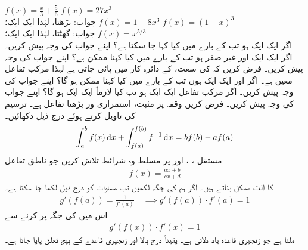 $f(x)=\tfrac{x}{3}+\tfrac{5}{6}$
$f(x)=27x^3$\\
جواب:\quad
بڑھتا، لہٰذا ایک ایک؛ 
$f(x)=1-8x^3$
$f(x)=(1-x)^3$\\
جواب:\quad
گھٹتا، لہٰذا ایک ایک؛ 
$f(x)=x^{5/3}$
\\
اگر  ایک ایک ہو تب  کے بارے میں کیا کہا جا سکتا ہے؟ اپنے جواب کی وجہ پیش کریں۔
اگر  ایک ایک اور غیر صفر ہو تب  کے بارے میں کیا کہنا ممکن ہے؟ اپنے جواب کی وجہ پیش کریں۔
فرض کریں کہ  کی سعت،  کے دائرہ کار میں پائی جاتی ہے لہٰذا مرکب تفاعل  معین ہے۔ اگر  اور  ایک ایک ہوں تب  کے بارے میں کیا کہنا ممکن ہو گا؟ اپنے جواب کی وجہ پیش کریں۔
اگر مرکب تفاعل  ایک ایک ہو تب کیا  لازماً ایک ایک ہو گا؟ اپنے جواب کی وجہ پیش کریں۔
فرض کریں وقفہ  پر  مثبت، استمراری ور بڑھتا تفاعل  ہے۔ ترسیم کی تاویل کرتے ہوئے درج ذیل دکھائیں۔
\begin{align*}
\int_a^bf(x)\dif x+\int_{f(a)}^{f(b)}f^{-1}\dif x=bf(b)-af(a)
\end{align*}
مستقل ، ،  اور  پر مسلط وہ شرائط تلاش کریں جو ناطق تفاعل
\begin{align*}
f(x)=\frac{ax+b}{cx+d}
\end{align*}
کا الٹ ممکن بناتے ہیں۔
اگر ہم  کی جگہ  لکھیں تب مساوات  کو درج ذیل لکھا جا سکتا ہے۔
\begin{align*}
g'(f(a))=\frac{1}{f'(a)}\quad \implies g'(f(a))\cdot f'(a)=1
\end{align*}
اس میں  کی جگہ  پر کرنے سے  
\begin{align*}
g'(f(x))\cdot f'(x)=1
\end{align*}
ملتا ہے جو زنجیری قاعدہ یاد دلاتی ہے۔ یقیناً درج بالا اور زنجیری قاعدے کے بیچ تعلق پایا جاتا ہے۔

